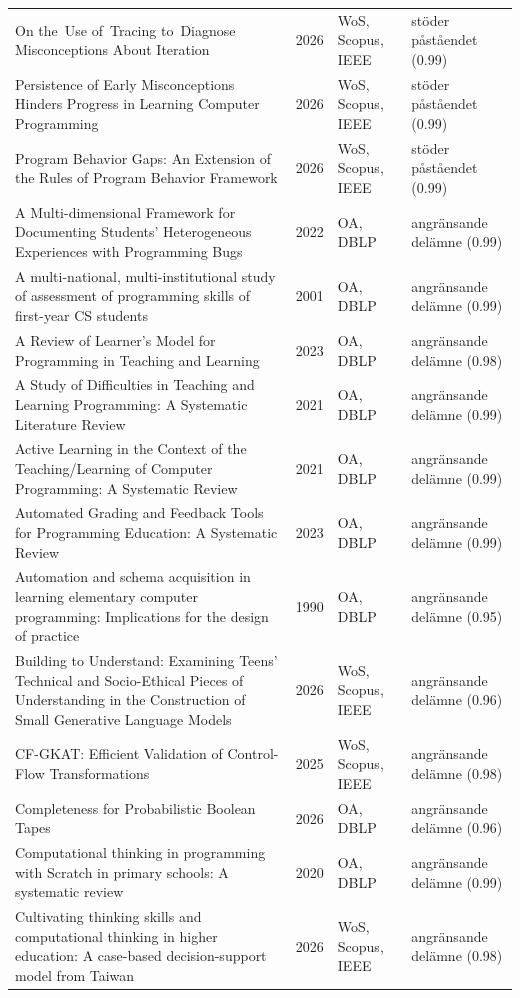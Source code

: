 \begin{longtable}{@{}%
  >{\raggedright\arraybackslash}p{}c%
  >{\raggedright\arraybackslash}p{}%
  >{\raggedright\arraybackslash}p{}@{}}
On the Use of Tracing to Diagnose Misconceptions About Iteration & 2026 & WoS, Scopus, IEEE & stöder påståendet (0.99) \\
Persistence of Early Misconceptions Hinders Progress in Learning Computer Programming & 2026 & WoS, Scopus, IEEE & stöder påståendet (0.99) \\
Program Behavior Gaps: An Extension of the Rules of Program Behavior Framework & 2026 & WoS, Scopus, IEEE & stöder påståendet (0.99) \\
A Multi-dimensional Framework for Documenting Students' Heterogeneous Experiences with Programming Bugs & 2022 & OA, DBLP & angränsande delämne (0.99) \\
A multi-national, multi-institutional study of assessment of programming skills of first-year CS students & 2001 & OA, DBLP & angränsande delämne (0.99) \\
A Review of Learner's Model for Programming in Teaching and Learning & 2023 & OA, DBLP & angränsande delämne (0.98) \\
A Study of Difficulties in Teaching and Learning Programming: A Systematic Literature Review & 2021 & OA, DBLP & angränsande delämne (0.99) \\
Active Learning in the Context of the Teaching/Learning of Computer Programming: A Systematic Review & 2021 & OA, DBLP & angränsande delämne (0.99) \\
Automated Grading and Feedback Tools for Programming Education: A Systematic Review & 2023 & OA, DBLP & angränsande delämne (0.99) \\
Automation and schema acquisition in learning elementary computer programming: Implications for the design of practice & 1990 & OA, DBLP & angränsande delämne (0.95) \\
Building to Understand: Examining Teens' Technical and Socio-Ethical Pieces of Understanding in the Construction of Small Generative Language Models & 2026 & WoS, Scopus, IEEE & angränsande delämne (0.96) \\
CF-GKAT: Efficient Validation of Control-Flow Transformations & 2025 & WoS, Scopus, IEEE & angränsande delämne (0.98) \\
Completeness for Probabilistic Boolean Tapes & 2026 & OA, DBLP & angränsande delämne (0.96) \\
Computational thinking in programming with Scratch in primary schools: A systematic review & 2020 & OA, DBLP & angränsande delämne (0.99) \\
Cultivating thinking skills and computational thinking in higher education: A case-based decision-support model from Taiwan & 2026 & WoS, Scopus, IEEE & angränsande delämne (0.98) \\

\end{longtable}
